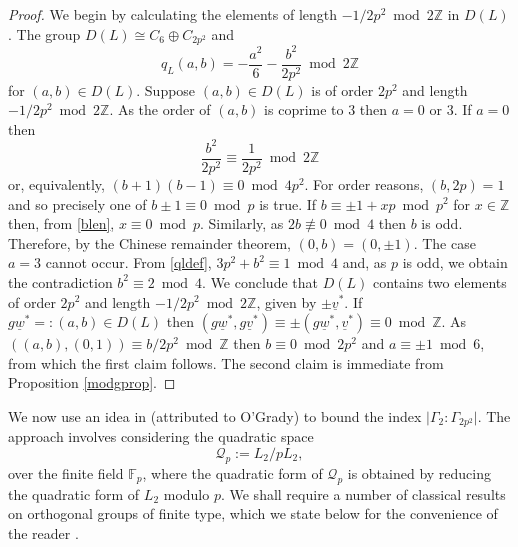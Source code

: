 \documentclass[11pt]{article}
\newcommand{\ZZ}{\mathbb{Z}}
\newcommand{\FF}{\mathbb{F}}
\newcommand{\qc}{\mathcal{Q}}
\newcommand{\op}{\oplus}
\newcommand{\beq}{\begin{equation*}}
\newcommand{\eeq}{\end{equation*}}
\begin{document}
\begin{proof}
  We begin by calculating the elements of length $-1/2p^2 \bmod{ 2 \ZZ}$ in $D(L)$.
  The group $D(L) \cong C_6 \op C_{2p^2}$ and
  \begin{equation}\label{qldef}
  q_{L}(a,b) = -\frac{a^2}{6} - \frac{b^2}{2p^2} \bmod{ 2\ZZ}
  \end{equation}
  for  $(a,b) \in D(L)$.
  Suppose $(a,b) \in D(L)$ is of order $2p^2$ and length $-1/2p^2 \bmod{ 2\ZZ}$.
  As the order of $(a,b)$ is coprime to 3 then $a=0$ or $3$.
  If $a=0$ then
  \begin{equation}\label{blen}
  \frac{b^2}{2p^2} \equiv \frac{1}{2p^2} \bmod{2 \ZZ}
  \end{equation}
  or, equivalently, $(b+1)(b-1) \equiv 0 \bmod{ 4p^2}$.
  For order reasons, $(b, 2p)=1$ and so
  precisely one of $b \pm 1 \equiv 0 \bmod{ p}$ is true.
  If $b \equiv \pm 1 + xp \bmod{ p^2}$ for $x\in \ZZ$ then, from \eqref{blen}, $x \equiv 0 \bmod{ p}$.
  Similarly, as $2 b \not \equiv 0 \bmod{ 4}$ then $b$ is odd.
  Therefore, by the Chinese remainder theorem, $(0,b) = (0, \pm 1)$.
  The case $a=3$ cannot occur.
  From \eqref{qldef}, $3p^2 + b^2 \equiv 1 \bmod{ 4}$ and, as $p$ is odd,  we obtain the contradiction $b^2 \equiv 2 \bmod{ 4}$.
  We conclude that $D(L)$ contains two elements of order $2p^2$ and length $-1/2p^2 \bmod{ 2\ZZ}$, given by $\pm \underline{v}^*$.
  If $g \underline{w}^* =: (a,b) \in D(L)$ then $(g \underline{w}^*, g \underline{v}^*) \equiv \pm (g \underline{w}^*, \underline{v}^*) \equiv 0 \bmod{ \ZZ}$.
  As $((a,b), (0,1)) \equiv b/2p^2 \bmod{ \ZZ}$ then $b \equiv 0 \bmod{ 2p^2}$ and $a \equiv \pm 1 \bmod{ 6}$, from which the first claim follows.
  The second claim is immediate from Proposition  \ref{modgprop}.
\end{proof}
We now use an idea in \cite{Kondo} (attributed to O'Grady) to bound the index $\vert \Gamma_2 : \Gamma_{2p^2}  \vert$.
The approach involves considering the  quadratic space
\beq
\qc_p  := L_{2} / pL_2,
\eeq
 over the finite field $\FF_p$, where the quadratic form of $\qc_p$ is obtained by reducing the quadratic form of $L_2$ modulo $p$.
We shall require a number of classical results on orthogonal groups of finite type, which we state below for the convenience of the reader \cite{Dieudonne}.
\end{document}
